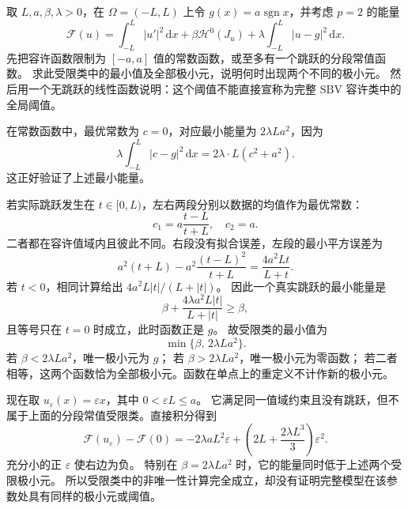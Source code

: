 \begin{exercise}\label{b1:ex:28-one-jump-mumford-shah}
取 \(L,a,\beta,\lambda>0\)，在 \(\Omega=(-L,L)\) 上令
\(g(x)=a\operatorname{sgn}x\)，并考虑 \(p=2\) 的能量
\[
 \mathcal F(u)=\int_{-L}^L|u'|^2\,\mathrm dx
 +\beta\mathcal H^0(J_u)
 +\lambda\int_{-L}^L|u-g|^2\,\mathrm dx.
\]
先把容许函数限制为 \([-a,a]\) 值的常数函数，或至多有一个跳跃的分段常值函数。
求此受限类中的最小值及全部极小元，说明何时出现两个不同的极小元。
然后用一个无跳跃的线性函数说明：这个阈值不能直接宣称为完整
\(\mathrm{SBV}\) 容许类中的全局阈值。
\end{exercise}
\begin{solution}
在常数函数中，最优常数为 \(c=0\)，对应最小能量为 \(2\lambda La^2\)，因为
\[
 \lambda\int_{-L}^L|c-g|^2\,\mathrm dx
 =2\lambda\cdot L(c^2+a^2).
\]
这正好验证了上述最小能量。

若实际跳跃发生在 \(t\in[0,L)\)，左右两段分别以数据的均值作为最优常数：
\[
 c_1=a\frac{t-L}{t+L},\quad c_2=a.
\]
二者都在容许值域内且彼此不同。右段没有拟合误差，左段的最小平方误差为
\[
 a^2(t+L)-a^2\frac{(t-L)^2}{t+L}
 =\frac{4a^2Lt}{L+t}.
\]
若 \(t<0\)，相同计算给出 \(4a^2L|t|/(L+|t|)\)。
因此一个真实跳跃的最小能量是
\[
 \beta+\frac{4\lambda a^2L|t|}{L+|t|}\ge\beta,
\]
且等号只在 \(t=0\) 时成立，此时函数正是 \(g\)。
故受限类的最小值为
\[
 \min\{\beta,\,2\lambda La^2\}.
\]
若 \(\beta<2\lambda La^2\)，唯一极小元为 \(g\)；
若 \(\beta>2\lambda La^2\)，唯一极小元为零函数；
若二者相等，这两个函数恰为全部极小元。函数在单点上的重定义不计作新的极小元。

现在取 \(u_\varepsilon(x)=\varepsilon x\)，其中 \(0<\varepsilon L\le a\)。
它满足同一值域约束且没有跳跃，但不属于上面的分段常值受限类。直接积分得到
\[
 \mathcal F(u_\varepsilon)-\mathcal F(0)
 =-2\lambda aL^2\varepsilon
  +\left(2L+\frac{2\lambda L^3}{3}\right)\varepsilon^2.
\]
充分小的正 \(\varepsilon\) 使右边为负。
特别在 \(\beta=2\lambda La^2\) 时，它的能量同时低于上述两个受限极小元。
所以受限类中的非唯一性计算完全成立，却没有证明完整模型在该参数处具有同样的极小元或阈值。
\end{solution}
